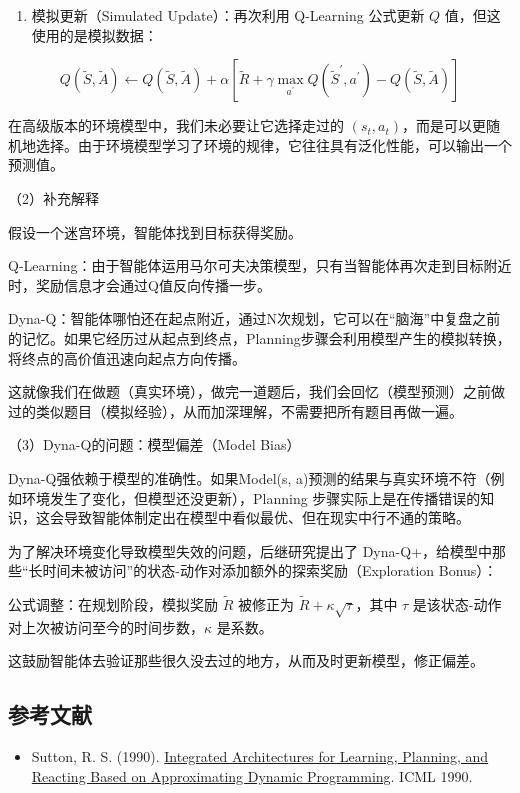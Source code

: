\begin{enumerate}
\def\labelenumi{\arabic{enumi}.}
\setcounter{enumi}{3}
\tightlist
\item
  模拟更新（Simulated Update）：再次利用 Q-Learning 公式更新 \(Q\) 值，但这使用的是模拟数据：
\end{enumerate}

\[
Q(\tilde{S},\tilde{A})\leftarrow Q(\tilde{S},\tilde{A})+\alpha[\tilde{R}+\gamma\max_{a^{\prime}}Q(\tilde{S}^{\prime},a^{\prime})-Q(\tilde{S},\tilde{A})]
\]

在高级版本的环境模型中，我们未必要让它选择走过的 \((s_t,a_t)\)，而是可以更随机地选择。由于环境模型学习了环境的规律，它往往具有泛化性能，可以输出一个预测值。

（2）补充解释

假设一个迷宫环境，智能体找到目标获得奖励。

Q-Learning：由于智能体运用马尔可夫决策模型，只有当智能体再次走到目标附近时，奖励信息才会通过Q值反向传播一步。

Dyna-Q：智能体哪怕还在起点附近，通过N次规划，它可以在``脑海''中复盘之前的记忆。如果它经历过从起点到终点，Planning步骤会利用模型产生的模拟转换，将终点的高价值迅速向起点方向传播。

这就像我们在做题（真实环境），做完一道题后，我们会回忆（模型预测）之前做过的类似题目（模拟经验），从而加深理解，不需要把所有题目再做一遍。

（3）Dyna-Q的问题：模型偏差（Model Bias）

Dyna-Q强依赖于模型的准确性。如果Model(s, a)预测的结果与真实环境不符（例如环境发生了变化，但模型还没更新），Planning 步骤实际上是在传播错误的知识，这会导致智能体制定出在模型中看似最优、但在现实中行不通的策略。

为了解决环境变化导致模型失效的问题，后继研究提出了 Dyna-Q+，给模型中那些``长时间未被访问''的状态-动作对添加额外的探索奖励（Exploration Bonus）：

公式调整：在规划阶段，模拟奖励 \(\tilde{R}\) 被修正为 \(\tilde{R}+\kappa\sqrt{\tau}\)，其中 \(\tau\) 是该状态-动作对上次被访问至今的时间步数，\(\kappa\) 是系数。

这鼓励智能体去验证那些很久没去过的地方，从而及时更新模型，修正偏差。

\hypertarget{ux53c2ux8003ux6587ux732e-49}{%
\subsection{参考文献}\label{ux53c2ux8003ux6587ux732e-49}}

\vspace{0.25em}
\begin{itemize}
\tightlist
\item
  Sutton, R. S. (1990). \href{http://incompleteideas.net/papers/sutton-90.pdf}{Integrated Architectures for Learning, Planning, and Reacting Based on Approximating Dynamic Programming}. ICML 1990.
\end{itemize}

